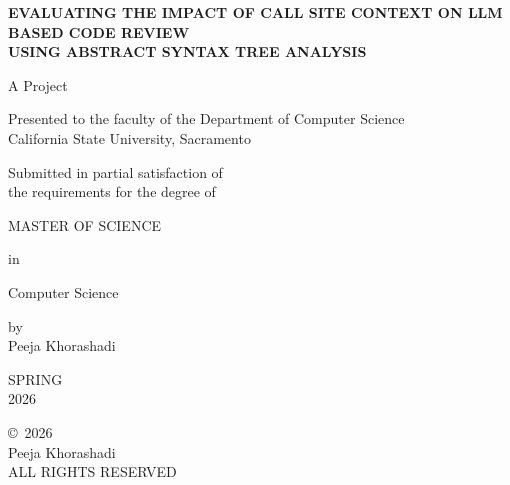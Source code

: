 \documentclass[12pt]{report}
\newif\ifarabicpagenums
\newcommand{\FrontMatterStyle}{%
  \arabicpagenumsfalse
  \pagestyle{fancy}%
  \fancyhf{}%
  \fancyfoot[C]{\thepage}%
  \renewcommand{\headrulewidth}{0pt}%
  \renewcommand{\footrulewidth}{0pt}%
  \fancypagestyle{plain}{%
    \fancyhf{}%
    \fancyfoot[C]{\thepage}%
    \renewcommand{\headrulewidth}{0pt}%
    \renewcommand{\footrulewidth}{0pt}%
  }%
}
\begin{document}
\begin{titlepage}
\thispagestyle{empty}
\begin{center}
\begin{singlespace}
\vspace*{1in}

{\large\bfseries
EVALUATING THE IMPACT OF CALL SITE CONTEXT ON LLM BASED CODE REVIEW \\[12pt]
USING ABSTRACT SYNTAX TREE ANALYSIS
}

\vfill

A Project

\vspace{0.4in}

Presented to the faculty of the Department of Computer Science \\
California State University, Sacramento

\vspace{0.4in}

Submitted in partial satisfaction of \\
the requirements for the degree of

\vspace{0.4in}

MASTER OF SCIENCE

\vspace{0.2in}

in

\vspace{0.2in}

Computer Science

\vspace{0.4in}

by \\[6pt]
Peeja Khorashadi

\vfill

SPRING \\
2026
\end{singlespace}

\end{center}
\end{titlepage}

\FrontMatterStyle
\setcounter{page}{2}
\thispagestyle{fancy}
\vspace*{4in}
\begin{center}
\copyright~2026 \\[8pt]
Peeja Khorashadi \\[8pt]
ALL RIGHTS RESERVED
\end{center}
\clearpage
\end{document}

